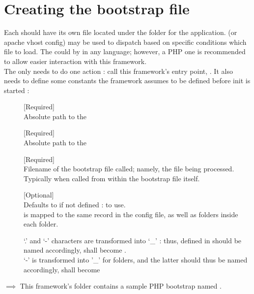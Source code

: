 \documentclass[pdftex,12pt,a4paper]{article}
\begin{document}
\section{Creating the bootstrap file}

Each  should have its own  file located under the  folder for the application.
 (or apache vhost config) may be used to dispatch based on specific conditions which  file to load.
The  could by in any language; however, a PHP one is recommended to allow easier interaction with this framework. \\
The  only needs to do one action : call this framework's entry point, .
It also needs to define some constants the framework assumes to be defined before init is started :
\begin{description}
 \item[] [Required] \hfill \\
    Absolute path to the 
 \item[] [Required] \hfill \\
    Absolute path to the 
 \item[] [Required] \hfill \\
    Filename of the bootstrap file called; namely, the file being processed. Typically  when called from within the bootstrap file itself.
 \item[] [Optional] \hfill \\
    Defaults to  if not defined :  to use. \\
     is mapped to the same record in the config file, as well as  folders inside each  folder. \\
    \begin{note}
    `.' and `-' characters are transformed into `\_' : thus,  defined in
     should be named accordingly, \eg {} shall become .\\
     `-' is transformed into '\_' for  folders, and the latter should thus be named accordingly, \eg {} shall become 
    \end{note}
\end{description}
$\implies$ This framework's  folder contains a sample PHP bootstrap named .
\end{document}
